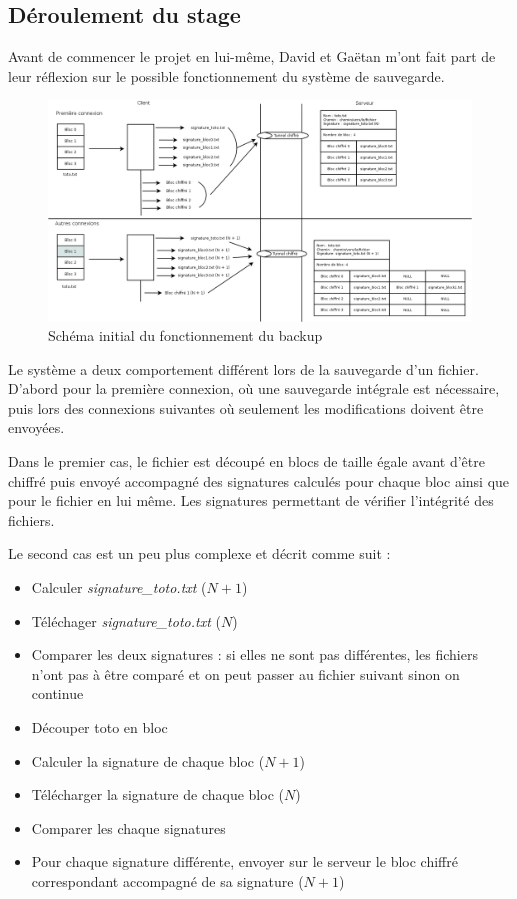 \documentclass[a4paper,10pt, twoside]{report}
\begin{document}
\begin{spacing}{1.2}
\section{D\'eroulement du stage}
Avant de commencer le projet en lui-m\^eme, David et Ga\"etan m'ont fait part
de leur r\'eflexion sur le possible fonctionnement du syst\`eme de sauvegarde.

\begin{figure}[h!]
    \hspace{-4.5em}
    \includegraphics[width=19cm]{algo/schemaInitial.png}
    \caption{\label{schemaInitial} Sch\'ema initial du fonctionnement du backup}
\end{figure}

Le syst\`eme a deux comportement diff\'erent lors de la sauvegarde d'un fichier.
D'abord pour la premi\`ere connexion, o\`u une sauvegarde int\'egrale est
n\'ecessaire, puis lors des connexions suivantes o\`u seulement les
modifications doivent \^etre envoy\'ees.

Dans le premier cas, le fichier est d\'ecoup\'e en blocs de taille \'egale
avant d'\^etre chiffr\'e puis envoy\'e accompagn\'e des signatures calcul\'es
pour chaque bloc ainsi que pour le fichier en lui m\^eme. Les signatures
permettant de v\'erifier l'int\'egrit\'e des fichiers.

Le second cas est un peu plus complexe et d\'ecrit comme suit :
\begin{itemize}
 \item Calculer \textit{signature\_toto.txt} (\(N + 1\))
 \item T\'el\'echager \textit{signature\_toto.txt} (\(N\))
 \item Comparer les deux signatures : si elles ne sont pas diff\'erentes, les
 fichiers n'ont pas \`a \^etre compar\'e et on peut passer au fichier suivant
 sinon on continue
 \item D\'ecouper toto en bloc
 \item Calculer la signature de chaque bloc (\(N + 1\))
 \item T\'el\'echarger la signature de chaque bloc (\(N\))
 \item Comparer les chaque signatures
 \item Pour chaque signature diff\'erente, envoyer sur le serveur le bloc
 chiffr\'e correspondant accompagn\'e de sa signature (\(N + 1\))
\end{itemize}


\end{spacing}
\end{document}
